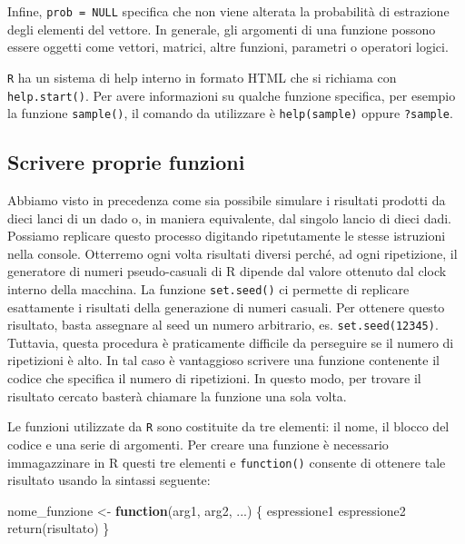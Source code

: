 \documentclass[
  11pt,
]{krantz}
\makeatletter
\newenvironment{Shaded}{\begin{snugshade}}{\end{snugshade}}
\newcommand{\ControlFlowTok}[1]{\textcolor[rgb]{0.27,0.27,0.27}{\textbf{#1}}}
\newcommand{\FunctionTok}[1]{\textcolor[rgb]{0,0,0}{#1}}
\newcommand{\NormalTok}[1]{#1}
\newcommand{\OtherTok}[1]{\textcolor[rgb]{0.37,0.37,0.37}{#1}}
\newenvironment{kframe}{%
\medskip{}
\setlength{\fboxsep}{.8em}
 \def\at@end@of@kframe{}%
 \ifinner\ifhmode%
  \def\at@end@of@kframe{\end{minipage}}%
  \begin{minipage}{\columnwidth}%
 \fi\fi%
 \def\FrameCommand##1{\hskip\@totalleftmargin \hskip-\fboxsep
 \colorbox{shadecolor}{##1}\hskip-\fboxsep
     \hskip-\linewidth \hskip-\@totalleftmargin \hskip\columnwidth}%
 \MakeFramed {\advance\hsize-\width
   \@totalleftmargin\z@ \linewidth\hsize
   \@setminipage}}%
 {\par\unskip\endMakeFramed%
 \at@end@of@kframe}
\renewenvironment{Shaded}{\begin{kframe}}{\end{kframe}}
\theoremstyle{definition}
\theoremstyle{definition}
\theoremstyle{definition}
\theoremstyle{definition}
\theoremstyle{remark}
\makeatother
\begin{document}
Infine, \texttt{prob\ =\ NULL} specifica che non viene alterata la probabilità di estrazione degli elementi del vettore. In generale, gli argomenti di una funzione possono essere oggetti come vettori, matrici, altre funzioni, parametri o operatori logici.

\texttt{R} ha un sistema di help interno in formato HTML che si richiama con \texttt{help.start()}. Per avere informazioni su qualche funzione specifica, per esempio la funzione \texttt{sample()}, il comando da utilizzare è \texttt{help(sample)} oppure \texttt{?sample}.

\hypertarget{scrivere-proprie-funzioni}{%
\subsection{Scrivere proprie funzioni}\label{scrivere-proprie-funzioni}}

Abbiamo visto in precedenza come sia possibile simulare i risultati prodotti da dieci lanci di un dado o, in maniera equivalente, dal singolo lancio di dieci dadi. Possiamo replicare questo processo digitando ripetutamente le stesse istruzioni nella console. Otterremo ogni volta risultati diversi perché, ad ogni ripetizione, il generatore di numeri pseudo-casuali di R dipende dal valore ottenuto dal clock interno della macchina. La funzione \texttt{set.seed()} ci permette di replicare esattamente i risultati della generazione di numeri casuali. Per ottenere questo risultato, basta assegnare al seed un numero arbitrario, es. \texttt{set.seed(12345)}. Tuttavia, questa procedura è praticamente difficile da perseguire se il numero di ripetizioni è alto. In tal caso è vantaggioso scrivere una funzione contenente il codice che specifica il numero di ripetizioni. In questo modo, per trovare il risultato cercato basterà chiamare la funzione una sola volta.

Le funzioni utilizzate da \texttt{R} sono costituite da tre elementi: il nome, il blocco del codice e una serie di argomenti. Per creare una funzione è necessario immagazzinare in R questi tre elementi e \texttt{function()} consente di ottenere tale risultato usando la sintassi seguente:

\begin{Shaded}
\begin{Highlighting}[]
\NormalTok{nome\_funzione }\OtherTok{\textless{}{-}} \ControlFlowTok{function}\NormalTok{(arg1, arg2, ...) \{}
\NormalTok{  espressione1}
\NormalTok{  espressione2}
  \FunctionTok{return}\NormalTok{(risultato)}
\NormalTok{\} }
\end{Highlighting}
\end{Shaded}
\end{document}
